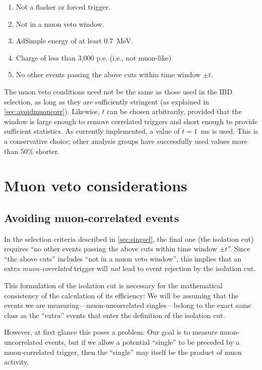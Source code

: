 \documentclass[../thesis.tex]{subfiles}
\begin{document}
\begin{enumerate}
\item Not a flasher or forced trigger.
\item Not in a muon veto window.
\item AdSimple energy of at least 0.7~MeV.
\item Charge of less than 3,000 p.e. (i.e., not muon-like)
\item No other events passing the above cuts within time window $\pm t$.
\end{enumerate}

The muon veto conditions need not be the same as those used in the IBD
selection, as long as they are sufficiently stringent (as explained in
\autoref{sec:avoidmuoncorr}). Likewise, $t$ can be chosen arbitrarily, provided
that the window is large enough to remove correlated triggers and short enough
to provide sufficient statistics. As currently implemented, a value of $t =
1$~ms is used. This is a conservative choice; other analysis groups have
successfully used values more than 50\% shorter.

\section{Muon veto considerations}
\label{sec:muonventoconsider}

\subsection{Avoiding muon-correlated events}
\label{sec:avoidmuoncorr}

In the selection criteria described in \autoref{sec:singsel}, the final one (the
isolation cut) requires ``no other events passing the above cuts within time
window $\pm t$''. Since ``the above cuts'' includes ``not in a muon veto
window'', this implies that an extra \emph{muon-correlated} trigger will
\emph{not} lead to event rejection by the isolation cut.

This formulation of the isolation cut is necessary for the mathematical
consistency of the calculation of its efficiency: We will be assuming that the
events we are measuring---muon-uncorrelated singles---belong to the exact same
class as the ``extra'' events that enter the definition of the isolation cut.

However, at first glance this poses a problem: Our goal is to measure
muon-uncorrelated events, but if we allow a potential ``single'' to be preceded
by a muon-correlated trigger, then the ``single'' may itself be the product of
muon activity.
\end{document}
